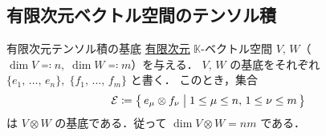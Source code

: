 \documentclass[rep_main]{subfiles}
\begin{document}
\subsection{有限次元ベクトル空間のテンソル積}

\begin{myprop}[label=prop:basis-tensor]{有限次元テンソル積の基底}
	\underline{有限次元} $\mathbb{K}$-ベクトル空間 $V,\, W$（$\dim V \eqqcolon n,\; \dim W \eqqcolon m$）を与える．
    $V,\, W$ の基底をそれぞれ $\{e_1,\, \dots,\, e_n\},\; \{f_1,\, \dots,\, f_m\}$ と書く．
	このとき，集合
	\begin{align}
		\mathcal{E} \coloneqq \bigl\{\, e_\mu \otimes f_\nu \bigm| 1 \le \mu \le n,\, 1 \le \nu \le m \,\bigr\} 
	\end{align}
	は $V \otimes W$ の基底である．従って $\dim V \otimes W = nm$ である．
\end{myprop}
\end{document}
